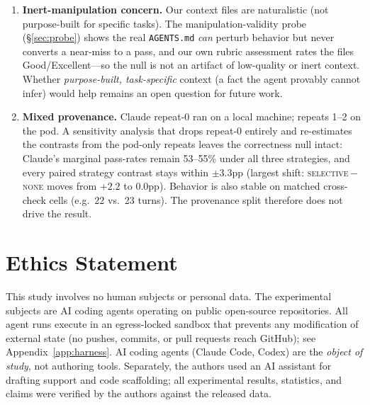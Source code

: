 \documentclass[11pt]{article}
\newcommand{\agentsmd}{\texttt{AGENTS.md}}
\newcommand{\none}{\textsc{none}}
\newcommand{\selective}{\textsc{selective}}
\begin{document}
\begin{enumerate}
    \item \textbf{Inert-manipulation concern.} Our context files are naturalistic (not purpose-built for specific tasks). The manipulation-validity probe (\S\ref{sec:probe}) shows the real \agentsmd{} \emph{can} perturb behavior but never converts a near-miss to a pass, and our own rubric assessment rates the files Good/Excellent---so the null is not an artifact of low-quality or inert context. Whether \emph{purpose-built, task-specific} context (a fact the agent provably cannot infer) would help remains an open question for future work.
    \item \textbf{Mixed provenance.} Claude repeat-0 ran on a local machine; repeats 1--2 on the pod. A sensitivity analysis that drops repeat-0 entirely and re-estimates the contrasts from the pod-only repeats leaves the correctness null intact: Claude's marginal pass-rates remain 53--55\% under all three strategies, and every paired strategy contrast stays within ${\pm}3.3$pp (largest shift: \selective{}\,$-$\,\none{} moves from $+2.2$ to $0.0$pp). Behavior is also stable on matched cross-check cells (e.g.\ 22 vs.\ 23 turns). The provenance split therefore does not drive the result.
\end{enumerate}

\section*{Ethics Statement}
This study involves no human subjects or personal data. The experimental subjects are
AI coding agents operating on public open-source repositories. All agent runs execute in
an egress-locked sandbox that prevents any modification of external state (no pushes,
commits, or pull requests reach GitHub); see Appendix~\ref{app:harness}.
AI coding agents (Claude Code, Codex) are the \emph{object of study}, not authoring tools.
Separately, the authors used an AI assistant for drafting support and code scaffolding;
all experimental results, statistics, and claims were verified by the authors against the
released data.


\end{document}
